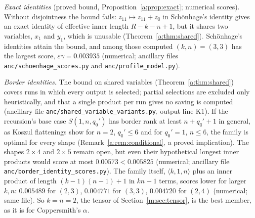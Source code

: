\documentclass[11pt]{article}
\theoremstyle{definition}
\theoremstyle{remark}
\begin{document}
\emph{Exact identities} (proved bound, Proposition~\ref{a:prop:exact}; numerical scores). Without disjointness the bound fails: $z_{11}\mapsto z_{11}+z_0$ in Schönhage's identity gives an exact identity of effective inner length $R-k-n+1$, but it shares two variables, $x_1$ and $y_1$, which is unusable (Theorem~\ref{a:thm:shared}). Schönhage's identities attain the bound, and among those computed $(k,n)=(3,3)$ has the largest score, $\varepsilon\gamma=0.003935$ (numerical; ancillary files \texttt{anc/schoenhage\_scores.py} and \texttt{anc/profile\_model.py}).

\emph{Border identities.} The bound on shared variables (Theorem~\ref{a:thm:shared}) covers runs in which every output is selected; partial selections are excluded only heuristically, and that a single product per run gives no saving is computed (ancillary file \texttt{anc/shared\_variable\_variants.py}, output line K1). If the recursion's base case $S(1,n,q_0')$ has border rank at least $n+q_0'+1$ in general, as Koszul flattenings show for $n=2$, $q_0'\le6$ and for $q_0'=1$, $n\le6$, the family is optimal for every shape (Remark~\ref{a:rem:conditional}, a proved implication). The shapes $2\times4$ and $2\times5$ remain open, but even their hypothetical longest inner products would score at most $0.00573<0.005825$ (numerical; ancillary file \texttt{anc/border\_identity\_scores.py}). The family itself, $\langle k,1,n\rangle$ plus an inner product of length $(k-1)(n-1)+1$ in $kn+1$ terms, scores lower for larger $k,n$: $0.005489$ for $(2,3)$, $0.004771$ for $(3,3)$, $0.004720$ for $(2,4)$ (numerical; same file). So $k=n=2$, the tensor of Section~\ref{m:sec:tensor}, is the best member, as it is for Coppersmith's $\alpha$.
\end{document}

